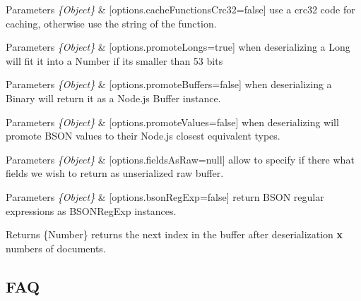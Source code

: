 \begin{DoxyItemize}
\begin{DoxyItemize}
\item 
\begin{DoxyParams}{Parameters}
{\em \{\+Object\}} & \mbox{[}options.\+cache\+Functions\+Crc32=false\mbox{]} use a crc32 code for caching, otherwise use the string of the function.\\
\hline
\end{DoxyParams}

\item 
\begin{DoxyParams}{Parameters}
{\em \{\+Object\}} & \mbox{[}options.\+promote\+Longs=true\mbox{]} when deserializing a Long will fit it into a Number if it\textquotesingle{}s smaller than 53 bits\\
\hline
\end{DoxyParams}

\item 
\begin{DoxyParams}{Parameters}
{\em \{\+Object\}} & \mbox{[}options.\+promote\+Buffers=false\mbox{]} when deserializing a Binary will return it as a Node.\+js Buffer instance.\\
\hline
\end{DoxyParams}

\item 
\begin{DoxyParams}{Parameters}
{\em \{\+Object\}} & \mbox{[}options.\+promote\+Values=false\mbox{]} when deserializing will promote B\+S\+ON values to their Node.\+js closest equivalent types.\\
\hline
\end{DoxyParams}

\item 
\begin{DoxyParams}{Parameters}
{\em \{\+Object\}} & \mbox{[}options.\+fields\+As\+Raw=null\mbox{]} allow to specify if there what fields we wish to return as unserialized raw buffer.\\
\hline
\end{DoxyParams}

\item 
\begin{DoxyParams}{Parameters}
{\em \{\+Object\}} & \mbox{[}options.\+bson\+Reg\+Exp=false\mbox{]} return B\+S\+ON regular expressions as B\+S\+O\+N\+Reg\+Exp instances.\\
\hline
\end{DoxyParams}

\item \begin{DoxyReturn}{Returns}
\{Number\} returns the next index in the buffer after deserialization {\bfseries x} numbers of documents.
\end{DoxyReturn}
\subsection*{F\+AQ}
\end{DoxyItemize}
\end{DoxyItemize}

